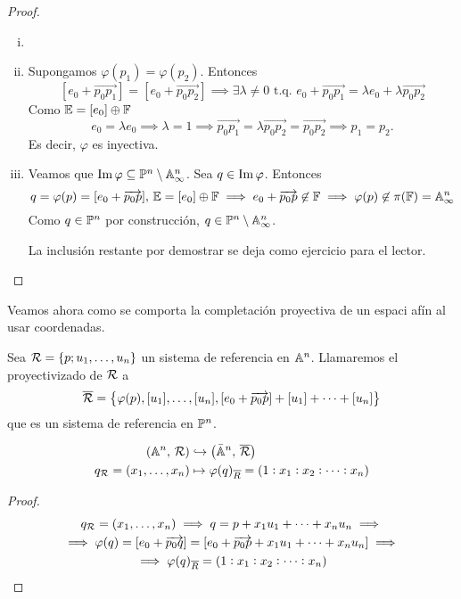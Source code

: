\begin{proof}
  \begin{enumerate}[i)]
    \item[]
    \item Supongamos $\varphi(p_1) = \varphi(p_2)$. Entonces
    \[
      [e_0 + \overrightarrow{p_0p_1}] = [e_0+\overrightarrow{p_0p_2}]
      \implies \exists \lambda \neq 0 \text{ t.q. } e_0 + \overrightarrow{p_0p_1}
      = \lambda e_0 + \lambda \overrightarrow{p_0p_2}
    \]
    Como $\mathbb{E} = [e_0] \oplus \mathbb{F}$
    \[e_0 = \lambda e_0 \implies \lambda = 1 \implies \overrightarrow{p_0p_1}
    = \lambda \overrightarrow{p_0p_2} = \overrightarrow{p_0p_2} \implies
    p_1 = p_2.\]
    Es decir, $\varphi$ es inyectiva.
    \item Veamos que $\operatorname{Im} \varphi \subseteq \mathbb{P}^n \setminus \mathbb{A}^n_\infty$. Sea
    $q \in \operatorname{Im} \varphi$. Entonces
    \[
      q = \varphi(p) = [e_0+\overrightarrow{p_0p}], \, \mathbb{E} = [e_0] \oplus \mathbb{F}
      \implies e_0 + \overrightarrow{p_0p} \not \in \mathbb{F} \implies
      \varphi(p) \not \in \pi(\mathbb{F}) = \mathbb{A}^n_\infty
    \]
    Como $q \in \mathbb{P}^n$ por construcción, $q \in \mathbb{P}^n \setminus \mathbb{A}^n_\infty$.
    
    La inclusión restante por demostrar se deja como ejercicio para el lector.
  \end{enumerate}
\end{proof}

Veamos ahora como se comporta la completación proyectiva de un espaci afín
al usar coordenadas.

\begin{defi}
  Sea $\mathcal{R} = \left \{p;u_1, \dots, u_n \right \}$ un sistema de referencia en
  $\mathbb{A}^n$. Llamaremos el proyectivizado de $\mathcal{R}$ a
  \[
    \overline{\mathcal{R}} = \left \{ \varphi(p), [u_1], \dots, [u_n], 
    [e_0 + \overrightarrow{p_0p}] + [u_1] + \dots + [u_n] \right \}
  \]
  que es un sistema de referencia en $\mathbb{P}^n$.
\end{defi}

\begin{prop}  
  \[
    \begin{aligned}
      \left( \mathbb{A}^n, \, \mathcal{R} \right) &\hookrightarrow \bigl( \bar{\mathbb{A}}^n, \, \overline{\mathcal{R}} 
      \bigr) \\
      q_{\mathcal{R}} = \left( x_1, \dots, x_n \right) &\mapsto \varphi(q)_{\overline{R}} = \left(
      1 : x_1 : x_2 : \dots : x_n \right)
    \end{aligned}  
  \]
\end{prop}

\begin{proof}
  \begin{gather*}
    q_{\mathcal{R}} = \left( x_1, \dots, x_n \right) \implies q = p + x_1u_1 + \dots + x_nu_n \implies \\
    \implies \varphi(q) = [e_0 + \overrightarrow{p_0q}] = [e_0+\overrightarrow{p_0p}
    + x_1u_1 + \dots + x_nu_n]\implies\\
    \implies \varphi(q)_{\overline{R}} = \left( 1 : x_1 : x_2 : \dots : x_n \right)
  \end{gather*}
\end{proof}

